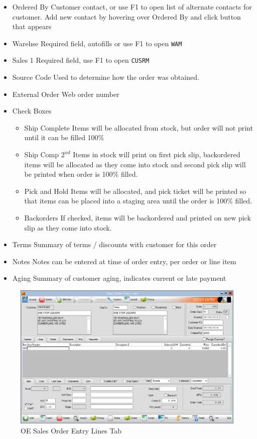 \begin{enumerate}
\begin{itemize}
		\item Ordered By \textemdash Customer contact, or use F1 to open list of alternate contacts for customer. Add new contact by hovering over Ordered By and click button that appears
		\item Warehse \textemdash Required field, autofills or use F1 to open \texttt{WAM}
		\item Sales 1 \textemdash Required field, use F1 to open \texttt{CUSRM}
		\item Source Code \textemdash Used to determine how the order was obtained.
		\item External Order \textemdash Web order number
		\item Check Boxes
		\begin{itemize}
			\item Ship Complete \textemdash Items will be allocated from stock, but order will not print until it can be filled 100\%
			\item Ship Comp $2^{nd}$ \textemdash Items in stock will print on first pick slip, backordered items will be allocated as they come into stock and second pick slip will be printed when order is 100\% filled.
			\item Pick and Hold \textemdash Items will be allocated, and pick ticket will be printed so that items can be placed into a staging area until the order is 100\% filled.
			\item Backorders \textemdash If checked, items will be backordered and printed on new pick slip as they come into stock.
		\end{itemize}
		\item Terms \textemdash Summary of terms / discounts with customer for this order
		\item Notes \textemdash Notes can be entered at time of order entry, per order or line item
		\item Aging \textemdash Summary of customer aging, indicates current or late payment		
	\end{itemize}
	
	\begin{figure}[H]
		\includegraphics[width=\textwidth]{../img/image93}
		\caption{OE Sales Order Entry Lines Tab}
	\end{figure}
	

\end{enumerate}
